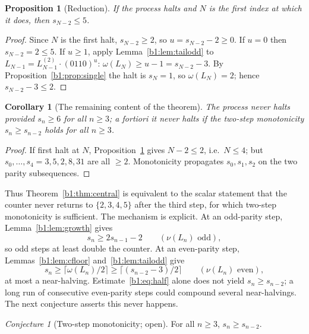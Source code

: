 \documentclass[a4paper]{article}
\theoremstyle{plain}
\newtheorem{proposition}{Proposition}[subsection]
\newtheorem{corollary}{Corollary}[subsection]
\theoremstyle{definition}
\theoremstyle{remark}
\newtheorem{conjecture}{Conjecture}[subsection]
\begin{document}
\begin{proposition}[Reduction]\label{b1:prop:firsthalt}
If the process halts and $N$ is the first index at which it does, then $s_{N-2}\le 5$.
\end{proposition}
\begin{proof}
Since $N$ is the first halt, $s_{N-2}\ge 2$, so $u=s_{N-2}-2\ge 0$. If $u=0$ then $s_{N-2}=2\le 5$. If $u\ge 1$, apply Lemma~\ref{b1:lem:tailodd} to $L_{N-1}=L^{(2)}_{N-1}\cdot(0110)^u$: $\omega(L_N)\ge u-1=s_{N-2}-3$. By Proposition~\ref{b1:prop:single} the halt is $s_N=1$, so $\omega(L_N)=2$; hence $s_{N-2}-3\le 2$.
\end{proof}

\begin{corollary}[The remaining content of the theorem]\label{b1:cor:remaining}
The process never halts provided $s_n\ge 6$ for all $n\ge 3$; a fortiori it never halts if the two-step monotonicity $s_n\ge s_{n-2}$ holds for all $n\ge 3$.
\end{corollary}
\begin{proof}
If first halt at $N$, Proposition~\ref{b1:prop:firsthalt} gives $N-2\le 2$, i.e.\ $N\le 4$; but $s_0,\dots,s_4=3,5,2,8,31$ are all $\ge 2$. Monotonicity propagates $s_0,s_1,s_2$ on the two parity subsequences.
\end{proof}

Thus Theorem~\ref{b1:thm:central} is equivalent to the scalar statement that the counter never returns to $\{2,3,4,5\}$ after the third step, for which two-step monotonicity is sufficient. The mechanism is explicit. At an odd-parity step, Lemma~\ref{b1:lem:growth} gives
\begin{equation}\label{b1:eq:double}
s_n\ge 2s_{n-1}-2\qquad(\nu(L_n)\text{ odd}),
\end{equation}
so odd steps at least double the counter. At an even-parity step, Lemmas~\ref{b1:lem:cfloor} and~\ref{b1:lem:tailodd} give
\begin{equation}\label{b1:eq:half}
s_n\ge\lceil\omega(L_n)/2\rceil\ge\lceil(s_{n-2}-3)/2\rceil\qquad(\nu(L_n)\text{ even}),
\end{equation}
at most a near-halving. Estimate~\eqref{b1:eq:half} alone does not yield $s_n\ge s_{n-2}$; a long run of consecutive even-parity steps could compound several near-halvings. The next conjecture asserts this never happens.

\begin{conjecture}[Two-step monotonicity; open]\label{b1:conj:mono}
For all $n\ge 3$, $s_n\ge s_{n-2}$.
\end{conjecture}
\end{document}
